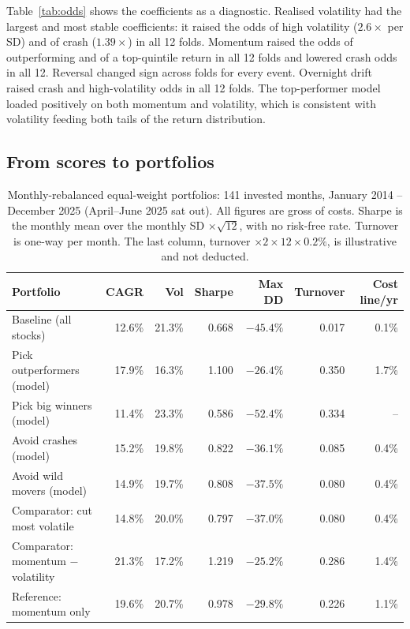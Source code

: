 \documentclass[11pt]{article}
\begin{document}
Table~\ref{tab:odds} shows the coefficients as a diagnostic. Realised volatility had the largest and most stable coefficients: it raised the odds of high volatility ($2.6\times$ per SD) and of crash ($1.39\times$) in all 12 folds. Momentum raised the odds of outperforming and of a top-quintile return in all 12 folds and lowered crash odds in all 12. Reversal changed sign across folds for every event. Overnight drift raised crash and high-volatility odds in all 12 folds. The top-performer model loaded positively on both momentum and volatility, which is consistent with volatility feeding both tails of the return distribution.

\subsection{From scores to portfolios}

\begin{table}[t]
\centering\small
\caption{Monthly-rebalanced equal-weight portfolios: 141 invested months, January 2014 -- December 2025 (April--June 2025 sat out). All figures are gross of costs. Sharpe is the monthly mean over the monthly SD $\times\sqrt{12}$, with no risk-free rate. Turnover is one-way per month. The last column, turnover $\times2\times12\times0.2\%$, is illustrative and not deducted.}
\label{tab:perf}
\begin{tabular}{@{}lrrrrrr@{}}
\toprule
Portfolio & CAGR & Vol & Sharpe & Max DD & Turnover & Cost line/yr\\
\midrule
Baseline (all stocks) & 12.6\% & 21.3\% & 0.668 & $-45.4\%$ & 0.017 & 0.1\%\\
\addlinespace
Pick outperformers (model) & 17.9\% & 16.3\% & 1.100 & $-26.4\%$ & 0.350 & 1.7\%\\
Pick big winners (model) & 11.4\% & 23.3\% & 0.586 & $-52.4\%$ & 0.334 & --\\
Avoid crashes (model) & 15.2\% & 19.8\% & 0.822 & $-36.1\%$ & 0.085 & 0.4\%\\
Avoid wild movers (model) & 14.9\% & 19.7\% & 0.808 & $-37.5\%$ & 0.080 & 0.4\%\\
\addlinespace
Comparator: cut most volatile & 14.8\% & 20.0\% & 0.797 & $-37.0\%$ & 0.080 & 0.4\%\\
Comparator: momentum $-$ volatility & 21.3\% & 17.2\% & 1.219 & $-25.2\%$ & 0.286 & 1.4\%\\
Reference: momentum only & 19.6\% & 20.7\% & 0.978 & $-29.8\%$ & 0.226 & 1.1\%\\
\bottomrule
\end{tabular}
\end{table}
\end{document}

